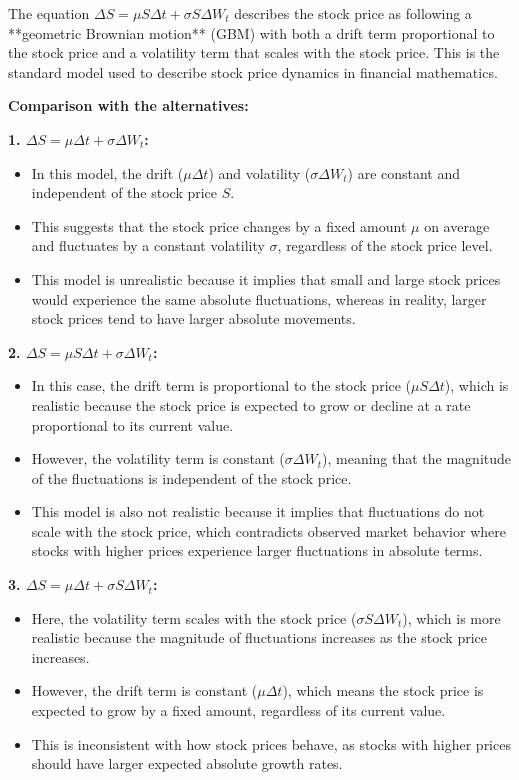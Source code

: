 \documentclass[12pt,letterpaper,onecolumn]{exam}
\begin{document}
\begin{solution}
The equation \( \Delta S = \mu S \Delta t + \sigma S \Delta W_t \) describes the stock price as following a **geometric Brownian motion** (GBM) with both a drift term proportional to the stock price and a volatility term that scales with the stock price. This is the standard model used to describe stock price dynamics in financial mathematics.

\textbf{Comparison with the alternatives:}

\textbf{1. \( \Delta S = \mu \Delta t + \sigma \Delta W_t \):}
\begin{itemize}
    \item In this model, the drift (\( \mu \Delta t \)) and volatility (\( \sigma \Delta W_t \)) are constant and independent of the stock price \( S \).
    \item This suggests that the stock price changes by a fixed amount \( \mu \) on average and fluctuates by a constant volatility \( \sigma \), regardless of the stock price level.
    \item This model is unrealistic because it implies that small and large stock prices would experience the same absolute fluctuations, whereas in reality, larger stock prices tend to have larger absolute movements.
\end{itemize}

\textbf{2. \( \Delta S = \mu S \Delta t + \sigma \Delta W_t \):}
\begin{itemize}
    \item In this case, the drift term is proportional to the stock price (\( \mu S \Delta t \)), which is realistic because the stock price is expected to grow or decline at a rate proportional to its current value.
    \item However, the volatility term is constant (\( \sigma \Delta W_t \)), meaning that the magnitude of the fluctuations is independent of the stock price.
    \item This model is also not realistic because it implies that fluctuations do not scale with the stock price, which contradicts observed market behavior where stocks with higher prices experience larger fluctuations in absolute terms.
\end{itemize}

\textbf{3. \( \Delta S = \mu \Delta t + \sigma S \Delta W_t \):}
\begin{itemize}
    \item Here, the volatility term scales with the stock price (\( \sigma S \Delta W_t \)), which is more realistic because the magnitude of fluctuations increases as the stock price increases.
    \item However, the drift term is constant (\( \mu \Delta t \)), which means the stock price is expected to grow by a fixed amount, regardless of its current value.
    \item This is inconsistent with how stock prices behave, as stocks with higher prices should have larger expected absolute growth rates.
\end{itemize}


\end{solution}
\end{document}
